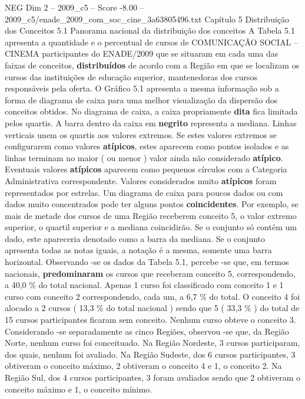 \begin{textsample}{NEG Dim 2 – 2009\_c5 – Score -8.00 – 2009\_c5/enade\_2009\_com\_soc\_cine\_3a63805496.txt}  \label{ex:f2_neg_002}
Capítulo 5 Distribuição dos Conceitos 5.1 Panorama nacional da distribuição dos conceitos A Tabela 5.1 apresenta a quantidade e o percentual de cursos de COMUNICAÇÃO SOCIAL – CINEMA participantes do ENADE/2009 que se situaram em cada uma das faixas de conceitos, \textbf{distribuídos} de acordo com a Região em que se localizam os cursos das instituições de educação superior, mantenedoras dos cursos responsáveis pela oferta.
O Gráfico 5.1 apresenta a mesma informação sob a forma de diagrama de caixa para uma melhor visualização da dispersão dos conceitos obtidos.
No diagrama de caixa, a caixa propriamente \textbf{dita} fica limitada pelos quartis.
A barra dentro da caixa em \textbf{negrito} representa a mediana.
Linhas verticais unem os quartis aos valores extremos.
Se estes valores extremos se configurarem como valores \textbf{atípicos}, estes aparecem como pontos isolados e as linhas terminam no maior ( ou menor ) valor ainda não considerado \textbf{atípico}.
Eventuais valores \textbf{atípicos} aparecem como pequenos círculos com a Categoria Administrativa correspondente.
Valores considerados muito \textbf{atípicos} foram representados por estrelas.
Um diagrama de caixa para poucos dados ou com dados muito concentrados pode ter alguns pontos \textbf{coincidentes}.
Por exemplo, se mais de metade dos cursos de uma Região receberem conceito 5, o valor extremo superior, o quartil superior e a mediana coincidirão.
Se o conjunto só contém um dado, este apareceria denotado como a barra da mediana.
Se o conjunto apresenta todas as notas iguais, a notação é a mesma, somente uma barra horizontal.
Observando -se os dados da Tabela 5.1, percebe -se que, em termos nacionais, \textbf{predominaram} os cursos que receberam conceito 5, correspondendo, a 40,0 \% do total nacional.
Apenas 1 curso foi classificado com conceito 1 e 1 curso com conceito 2 correspondendo, cada um, a 6,7 \% do total.
O conceito 4 foi alocado a 2 cursos ( 13,3 \% do total nacional ) sendo que 5 ( 33,3 \% ) do total de 15 cursos participantes ficaram sem conceito.
Nenhum curso obteve o conceito 3.
Considerando -se separadamente as cinco Regiões, observou -se que, da Região Norte, nenhum curso foi conceituado.
Na Região Nordeste, 3 cursos participaram, dos quais, nenhum foi avaliado.
Na Região Sudeste, dos 6 cursos participantes, 3 obtiveram o conceito máximo, 2 obtiveram o conceito 4 e 1, o conceito 2.
Na Região Sul, dos 4 cursos participantes, 3 foram avaliados sendo que 2 obtiveram o conceito máximo e 1, o conceito mínimo.

\end{textsample}
